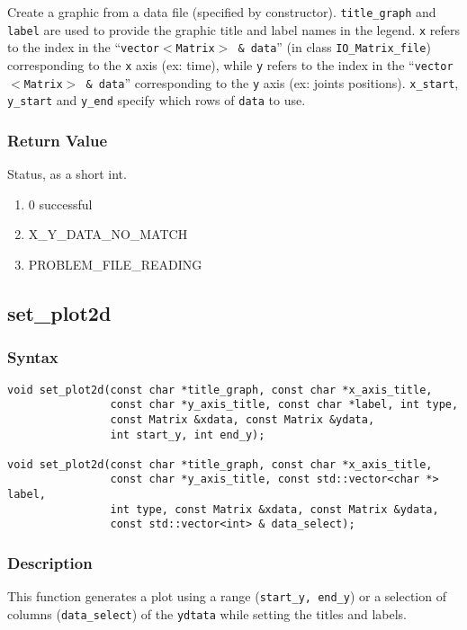 \documentclass[dvips,11pt,fleqn]{report}
\begin{document}
Create a graphic from a data file (specified by constructor).
\texttt{title\_graph} and \texttt{label} are used to provide the
graphic title and label names in the legend. \texttt{x} refers to the
index in the ``\texttt{vector$<$Matrix$>$ \& data}'' (in class
\texttt{IO\_Matrix\_file}) corresponding to the \texttt{x} axis (ex:
time), while \texttt{y} refers to the index in the
``\texttt{vector$<$Matrix$>$ \& data}'' corresponding to the
\texttt{y} axis (ex: joints positions). \texttt{x\_start},
\texttt{y\_start} and \texttt{y\_end} specify which rows of
\texttt{data} to use.


\subsubsection*{Return Value}
Status, as a short int.
\begin{enumerate}
\item[] 0 successful
\item[] X\_Y\_DATA\_NO\_MATCH
\item[] PROBLEM\_FILE\_READING
\end{enumerate}

 \newpage 

\subsection*{set\_plot2d}
\subsubsection*{Syntax}
\begin{verbatim}
void set_plot2d(const char *title_graph, const char *x_axis_title, 
                const char *y_axis_title, const char *label, int type, 
                const Matrix &xdata, const Matrix &ydata,
                int start_y, int end_y);

void set_plot2d(const char *title_graph, const char *x_axis_title, 
                const char *y_axis_title, const std::vector<char *> label,
                int type, const Matrix &xdata, const Matrix &ydata,
                const std::vector<int> & data_select);
\end{verbatim}
\subsubsection*{Description}
This function generates a plot using a range (\texttt{start\_y,
  end\_y}) or a selection of columns (\texttt{data\_select}) of the
\texttt{ydtata} while setting the titles and labels.
\end{document}
